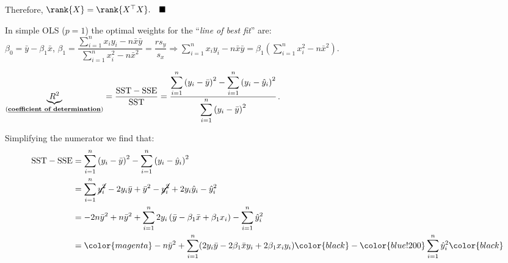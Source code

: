 \documentclass[12pt]{article}
\begin{document}
\begin{enumerate}
\begin{tcolorbox}[colback=white, sharp corners]
Therefore, $\rank{X} = \rank{X^\top X}. \quad \blacksquare$
\end{tcolorbox}


\newpage

\begin{tcolorbox}[colback=white, sharp corners]

In simple OLS ($p = 1$) the optimal weights for the ``\emph{line of best fit}'' are: \\ $\beta_0 = \bar{y} - \beta_1 \bar{x}$, $\beta_1 =\dfrac{ \displaystyle \sum_{i=1}^n x_i y_i - n \bar{x}\bar{y}}{ \displaystyle \sum_{i=1}^n x_i^2 - n\bar{x}^2} = \dfrac{r s_y}{s_x} \Rightarrow \displaystyle \sum_{i=1}^n x_i y_i - n \bar{x}\bar{y} = \beta_1 \left( \sum_{i=1}^n x_i^2 - n\bar{x}^2 \right) $. 

$\underbrace{R^2}_{(\textbf{\underline{coefficient of determination}})} = \dfrac{\mathrm{SST} - \mathrm{SSE}}{\mathrm{SST}}  = \dfrac{\displaystyle \sum_{i=1}^n \left( y_i - \bar{y} \right)^2 - \sum_{i=1}^n \left(y_i- \hat{y}_i \right)^2}{\displaystyle \sum_{i=1}^n \left(y_i - \bar{y} \right)^2}$. 

Simplifying the numerator we find that:
\begin{align*}
	\mathrm{SST} - \mathrm{SSE} &= \sum_{i=1}^n \left( y_i - \bar{y} \right)^2 - \sum_{i=1}^n \left(y_i- \hat{y}_i \right)^2\\
	&= \sum_{i=1}^n \cancel{y_i^2} - 2y_i \bar{y} + \bar{y}^2 - \cancel{y_i^2} + 2y_i \hat{y}_i - \hat{y}_i^2\\
	&= -2n\bar{y}^2 + n\bar{y}^2 + \sum_{i=1}^n 2y_i \left( \bar{y} - \beta_1 \bar{x} + \beta_1 x_i \right) - \sum_{i=1}^n \hat{y}_i^2 \\
	&= \color{magenta} -n\bar{y}^2 + \sum_{i=1}^n (2y_i\bar{y} - 2\beta_1 \bar{x} y_i + 2\beta_1 x_i y_i) \color{black} - \color{blue!200} \sum_{i=1}^n \hat{y}_i^2 \color{black}
\end{align*}


\end{tcolorbox}
\end{enumerate}
\end{document}
